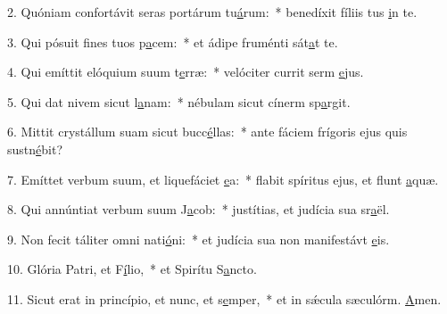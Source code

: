 2. Quóniam confortávit seras portárum tu\uline{á}rum:~* benedíxit fíliis tus \uline{i}n te.\par 
3. Qui pósuit fines tuos p\uline{a}cem:~* et ádipe fruménti sát\uline{a}t te.\par 
4. Qui emíttit elóquium suum t\uline{e}rræ:~* velóciter currit serm \uline{e}jus.\par 
5. Qui dat nivem sicut l\uline{a}nam:~* nébulam sicut cínerm sp\uline{a}rgit.\par 
6. Mittit crystállum suam sicut bucc\uline{é}llas:~* ante fáciem frígoris ejus quis sustn\uline{é}bit?\par 
7. Emíttet verbum suum, et liquefáciet \uline{e}a:~* flabit spíritus ejus, et flunt \uline{a}quæ.\par 
8. Qui annúntiat verbum suum J\uline{a}cob:~* justítias, et judícia sua sr\uline{a}ël.\par 
9. Non fecit táliter omni nati\uline{ó}ni:~* et judícia sua non manifestávt \uline{e}is.\par 
10. Glória Patri, et F\uline{í}lio,~* et Spirítu S\uline{a}ncto.\par 
11. Sicut erat in princípio, et nunc, et s\uline{e}mper,~* et in sǽcula sæculórm. \uline{A}men.\par 
